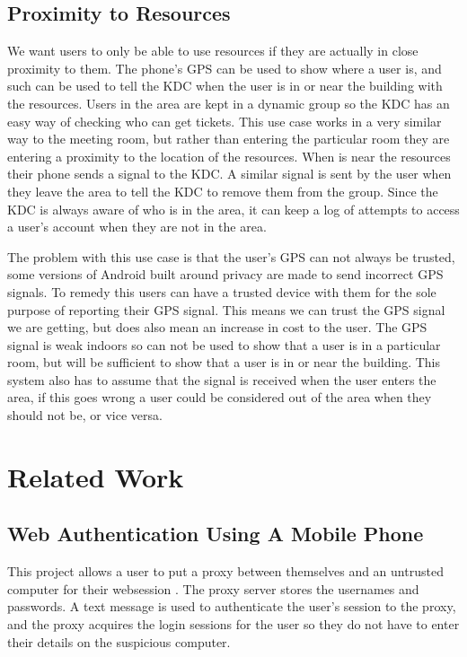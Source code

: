 \documentclass[]{report}   %
\begin{document}
\subsection{Proximity to Resources}
We want users to only be able to use resources if they are actually in close proximity to them. The phone's GPS can be used to show where a user is, and such can be used to tell the KDC when the user is in or near the building with the resources. Users in the area are kept in a dynamic group so the KDC has an easy way of checking who can get tickets. This use case works in a very similar way to the meeting room, but rather than entering the particular room they are entering a proximity to the location of the resources. When is near the resources their phone sends a signal to the KDC. A similar signal is sent by the user when they leave the area to tell the KDC to remove them from the group. Since the KDC is always aware of who is in the area, it can keep a log of attempts to access a user's account when they are not in the area.

The problem with this use case is that the user's GPS can not always be trusted, some versions of Android built around privacy are made to send incorrect GPS signals. To remedy this users can have a trusted device with them for the sole purpose of reporting their GPS signal. This means we can trust the GPS signal we are getting, but does also mean an increase in cost to the user. The GPS signal is weak indoors so can not be used to show that a user is in a particular room, but will be sufficient to show that a user is in or near the building. This system also has to assume that the signal is received when the user enters the area, if this goes wrong a user could be considered out of the area when they should not be, or vice versa.


\section{Related Work}
\subsection {Web Authentication Using A Mobile Phone}
This project allows a user to put a proxy between themselves and an untrusted computer for their websession \cite{Wu04secureweb}. The proxy server stores the usernames and passwords. A text message is used to authenticate the user's session to the proxy, and the proxy acquires the login sessions for the user so they do not have to enter their details on the suspicious computer.
\end{document}
